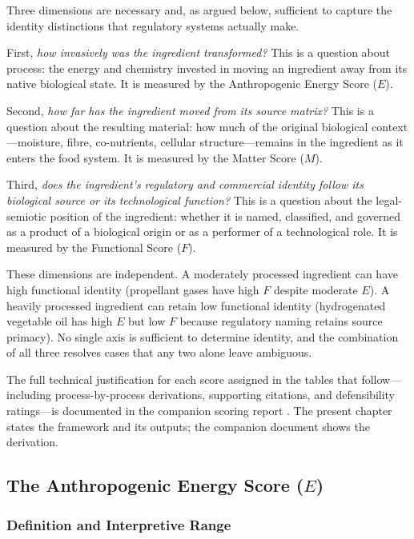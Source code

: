 \documentclass[12pt,a3paper]{article}
\begin{document}
Three dimensions are necessary and, as argued below, sufficient to capture the identity distinctions that regulatory systems actually make.

First, \textit{how invasively was the ingredient transformed?} This is a question about process: the energy and chemistry invested in moving an ingredient away from its native biological state. It is measured by the Anthropogenic Energy Score ($E$).

Second, \textit{how far has the ingredient moved from its source matrix?} This is a question about the resulting material: how much of the original biological context---moisture, fibre, co-nutrients, cellular structure---remains in the ingredient as it enters the food system. It is measured by the Matter Score ($M$).

Third, \textit{does the ingredient's regulatory and commercial identity follow its biological source or its technological function?} This is a question about the legal-semiotic position of the ingredient: whether it is named, classified, and governed as a product of a biological origin or as a performer of a technological role. It is measured by the Functional Score ($F$).

These dimensions are independent. A moderately processed ingredient can have high functional identity (propellant gases have high $F$ despite moderate $E$). A heavily processed ingredient can retain low functional identity (hydrogenated vegetable oil has high $E$ but low $F$ because regulatory naming retains source primacy). No single axis is sufficient to determine identity, and the combination of all three resolves cases that any two alone leave ambiguous.

The full technical justification for each score assigned in the tables that follow---including process-by-process derivations, supporting citations, and defensibility ratings---is documented in the companion scoring report \cite{EMF_JustificationCompanion}. The present chapter states the framework and its outputs; the companion document shows the derivation.

\subsection{The Anthropogenic Energy Score ($E$)}

\subsubsection{Definition and Interpretive Range}
\end{document}
